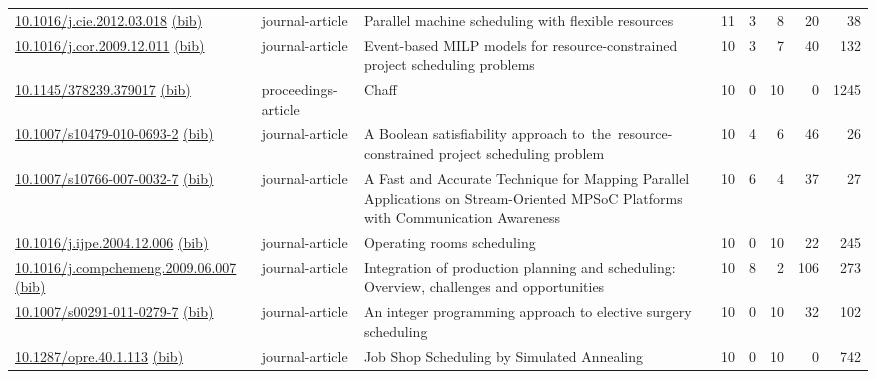 {\begin{longtable}{p{5cm}lp{11cm}rrrrr}
\href{http://dx.doi.org/10.1016/j.cie.2012.03.018}{10.1016/j.cie.2012.03.018} \href{https://www.doi2bib.org/bib/10.1016/j.cie.2012.03.018}{(bib)} & journal-article & Parallel machine scheduling with flexible resources & 11 & 3 & 8 & 20 & 38 \\
\href{http://dx.doi.org/10.1016/j.cor.2009.12.011}{10.1016/j.cor.2009.12.011} \href{https://www.doi2bib.org/bib/10.1016/j.cor.2009.12.011}{(bib)} & journal-article & Event-based MILP models for resource-constrained project scheduling problems & 10 & 3 & 7 & 40 & 132 \\
\href{http://dx.doi.org/10.1145/378239.379017}{10.1145/378239.379017} \href{https://www.doi2bib.org/bib/10.1145/378239.379017}{(bib)} & proceedings-article & Chaff & 10 & 0 & 10 & 0 & 1245 \\
\href{http://dx.doi.org/10.1007/s10479-010-0693-2}{10.1007/s10479-010-0693-2} \href{https://www.doi2bib.org/bib/10.1007/s10479-010-0693-2}{(bib)} & journal-article & A Boolean satisfiability approach to the resource-constrained project scheduling problem & 10 & 4 & 6 & 46 & 26 \\
\href{http://dx.doi.org/10.1007/s10766-007-0032-7}{10.1007/s10766-007-0032-7} \href{https://www.doi2bib.org/bib/10.1007/s10766-007-0032-7}{(bib)} & journal-article & A Fast and Accurate Technique for Mapping Parallel Applications on Stream-Oriented MPSoC Platforms with Communication Awareness & 10 & 6 & 4 & 37 & 27 \\
\href{http://dx.doi.org/10.1016/j.ijpe.2004.12.006}{10.1016/j.ijpe.2004.12.006} \href{https://www.doi2bib.org/bib/10.1016/j.ijpe.2004.12.006}{(bib)} & journal-article & Operating rooms scheduling & 10 & 0 & 10 & 22 & 245 \\
\href{http://dx.doi.org/10.1016/j.compchemeng.2009.06.007}{10.1016/j.compchemeng.2009.06.007} \href{https://www.doi2bib.org/bib/10.1016/j.compchemeng.2009.06.007}{(bib)} & journal-article & Integration of production planning and scheduling: Overview, challenges and opportunities & 10 & 8 & 2 & 106 & 273 \\
\href{http://dx.doi.org/10.1007/s00291-011-0279-7}{10.1007/s00291-011-0279-7} \href{https://www.doi2bib.org/bib/10.1007/s00291-011-0279-7}{(bib)} & journal-article & An integer programming approach to elective surgery scheduling & 10 & 0 & 10 & 32 & 102 \\
\href{http://dx.doi.org/10.1287/opre.40.1.113}{10.1287/opre.40.1.113} \href{https://www.doi2bib.org/bib/10.1287/opre.40.1.113}{(bib)} & journal-article & Job Shop Scheduling by Simulated Annealing & 10 & 0 & 10 & 0 & 742 \\

\end{longtable}}
